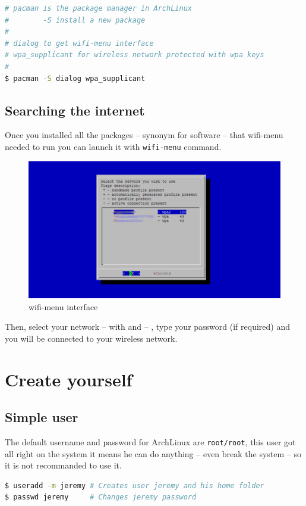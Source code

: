 \begin{lstlisting}[language=bash,caption=Install wireless dependencies]
# pacman is the package manager in ArchLinux
#        -S install a new package 
#
# dialog to get wifi-menu interface
# wpa_supplicant for wireless network protected with wpa keys
#
$ pacman -S dialog wpa_supplicant
\end{lstlisting}

\subsection{Searching the internet}
Once you installed all the packages -- synonym for software -- that wifi-menu 
needed to run you can launch it with \og{}\texttt{wifi-menu}\fg{} command.

\begin{figure}[h]
	\centering
	\includegraphics[scale=0.3]{images/WifiMenu.png}
	\caption{wifi-menu interface}
	\label{figure:WifiMenu}
\end{figure}

Then, select your network -- with \keys{\arrowkeyup} and \keys{\arrowkeydown} -- 
, type your password (if required) and you will be connected to your wireless 
network.
\newpage
\section{Create yourself}
\subsection{Simple user}
The default username and password for ArchLinux are \texttt{root/root}, this 
user got all right on the system it means he can do anything -- even break 
the system -- so it is not recommanded to use it.
\\
\begin{lstlisting}[language=bash,caption=Create a new user called jeremy]
$ useradd -m jeremy # Creates user jeremy and his home folder
$ passwd jeremy     # Changes jeremy password
\end{lstlisting}


